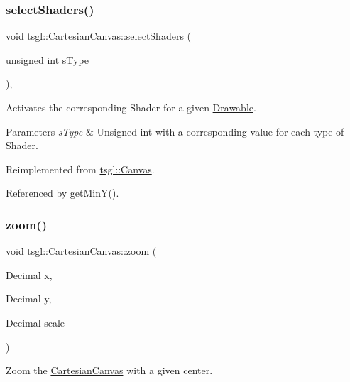 \subsubsection{\texorpdfstring{select\+Shaders()}{selectShaders()}}
{\footnotesize\ttfamily void tsgl\+::\+Cartesian\+Canvas\+::select\+Shaders (\begin{DoxyParamCaption}\item[{unsigned int}]{s\+Type }\end{DoxyParamCaption})\hspace{0.3cm}{\ttfamily [override]}, {\ttfamily [virtual]}}



Activates the corresponding Shader for a given \hyperlink{classtsgl_1_1_drawable}{Drawable}. 


\begin{DoxyParams}{Parameters}
{\em s\+Type} & Unsigned int with a corresponding value for each type of Shader. \\
\hline
\end{DoxyParams}


Reimplemented from \hyperlink{classtsgl_1_1_canvas}{tsgl\+::\+Canvas}.



Referenced by get\+Min\+Y().

\mbox{\label{classtsgl_1_1_cartesian_canvas_a69a378f61868c4c880889c33ec33c992}} 
\subsubsection{\texorpdfstring{zoom()}{zoom()}\hspace{0.1cm}{\footnotesize\ttfamily [1/2]}}
{\footnotesize\ttfamily void tsgl\+::\+Cartesian\+Canvas\+::zoom (\begin{DoxyParamCaption}\item[{Decimal}]{x,  }\item[{Decimal}]{y,  }\item[{Decimal}]{scale }\end{DoxyParamCaption})}



Zoom the \hyperlink{classtsgl_1_1_cartesian_canvas}{Cartesian\+Canvas} with a given center. 

